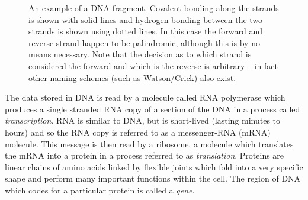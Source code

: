 \begin{figure}
  \centering
  \caption{
    An example of a DNA fragment. 
    Covalent bonding along the strands is shown with solid lines and hydrogen 
    bonding between the two strands is shown using dotted lines.
    In this case the forward and reverse strand happen to be palindromic, 
    although this is by no means necessary.
    Note that the decision as to which strand is considered the forward and
    which is the reverse is arbitrary -- in fact other naming schemes (such as
    Watson/Crick) also exist.
  }
  \label{fig:dna_pairing}
\end{figure}


The data stored in DNA is read by a molecule called RNA polymerase which 
produces a single stranded RNA copy of a section of the DNA in a process called
\textit{transcription}.
RNA is similar to DNA, but is short-lived (lasting minutes to hours) and so the
RNA copy is referred to as a messenger-RNA (mRNA) molecule.
This message is then read by a ribosome, a molecule which translates the mRNA 
into a protein in a process referred to as \textit{translation}.
Proteins are linear chains of amino acids linked by flexible joints which fold 
into a very specific shape and perform many important functions within the 
cell.
The region of DNA which codes for a particular protein is called a 
\textit{gene}.

